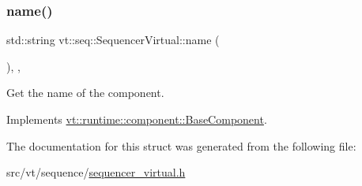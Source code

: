 \subsubsection{\texorpdfstring{name()}{name()}}
{\footnotesize\ttfamily std\+::string vt\+::seq\+::\+Sequencer\+Virtual\+::name (\begin{DoxyParamCaption}{ }\end{DoxyParamCaption})\hspace{0.3cm}{\ttfamily [inline]}, {\ttfamily [override]}, {\ttfamily [virtual]}}



Get the name of the component. 



Implements \hyperlink{structvt_1_1runtime_1_1component_1_1_base_component_a7701485f3539f78d42e6bad47fc7eb78}{vt\+::runtime\+::component\+::\+Base\+Component}.



The documentation for this struct was generated from the following file\+:\begin{DoxyCompactItemize}
\item 
src/vt/sequence/\hyperlink{sequencer__virtual_8h}{sequencer\+\_\+virtual.\+h}\end{DoxyCompactItemize}
